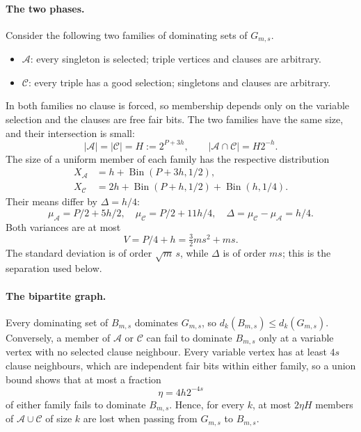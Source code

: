 \documentclass[11pt,a4paper]{article}
\theoremstyle{definition}
\theoremstyle{remark}
\newcommand{\Bin}{\operatorname{Bin}}
\newcommand{\cA}{\mathcal A}
\newcommand{\cC}{\mathcal C}
\begin{document}
\paragraph{The two phases.}
Consider the following two families of dominating sets of $G_{m,s}$.
\begin{itemize}
\item $\cA$: every singleton is selected; triple vertices and clauses are arbitrary.
\item $\cC$: every triple has a good selection; singletons and clauses are arbitrary.
\end{itemize}
In both families no clause is forced, so membership depends only on the variable selection and the clauses are free fair bits. The two families have the same size, and their intersection is small:
\[
|\cA|=|\cC|=H:=2^{P+3h},\qquad |\cA\cap\cC|=H2^{-h}.
\]
The size of a uniform member of each family has the respective distribution
\begin{align}
X_{\cA}&=h+\Bin(P+3h,1/2),\label{eq:phaseA}\\
X_{\cC}&=2h+\Bin(P+h,1/2)+\Bin(h,1/4).\label{eq:phaseB}
\end{align}
Their means differ by $\Delta=h/4$:
\begin{equation}\label{eq:means}
\mu_{\cA}=P/2+5h/2,\quad
\mu_{\cC}=P/2+11h/4,\quad
\Delta=\mu_{\cC}-\mu_{\cA}=h/4.
\end{equation}
Both variances are at most
\begin{equation}\label{eq:variance}
V=P/4+h=\tfrac32ms^2+ms.
\end{equation}
The standard deviation is of order $\sqrt m\,s$, while $\Delta$ is of order $ms$; this is the separation used below.

\paragraph{The bipartite graph.}
Every dominating set of $B_{m,s}$ dominates $G_{m,s}$, so $d_k(B_{m,s})\le d_k(G_{m,s})$. Conversely, a member of $\cA$ or $\cC$ can fail to dominate $B_{m,s}$ only at a variable vertex with no selected clause neighbour. Every variable vertex has at least $4s$ clause neighbours, which are independent fair bits within either family, so a union bound shows that at most a fraction
\begin{equation}\label{eq:eta}
\eta=4h2^{-4s}
\end{equation}
of either family fails to dominate $B_{m,s}$. Hence, for every $k$, at most $2\eta H$ members of $\cA\cup\cC$ of size $k$ are lost when passing from $G_{m,s}$ to $B_{m,s}$.
\end{document}
